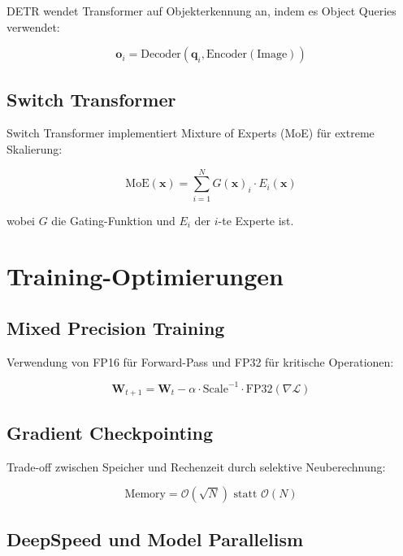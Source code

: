 DETR wendet Transformer auf Objekterkennung an, indem es Object Queries verwendet:

\begin{equation}
\mathbf{o}_i = \text{Decoder}(\mathbf{q}_i, \text{Encoder}(\text{Image}))
\end{equation}

\subsection{Switch Transformer}

Switch Transformer implementiert Mixture of Experts (MoE) für extreme Skalierung:

\begin{equation}
\text{MoE}(\mathbf{x}) = \sum_{i=1}^{N} G(\mathbf{x})_i \cdot E_i(\mathbf{x})
\end{equation}

wobei $G$ die Gating-Funktion und $E_i$ der $i$-te Experte ist.

\section{Training-Optimierungen}

\subsection{Mixed Precision Training}

Verwendung von FP16 für Forward-Pass und FP32 für kritische Operationen:

\begin{equation}
\mathbf{W}_{t+1} = \mathbf{W}_t - \alpha \cdot \text{Scale}^{-1} \cdot \text{FP32}(\nabla \mathcal{L})
\end{equation}

\subsection{Gradient Checkpointing}

Trade-off zwischen Speicher und Rechenzeit durch selektive Neuberechnung:

\begin{equation}
\text{Memory} = \mathcal{O}(\sqrt{N}) \text{ statt } \mathcal{O}(N)
\end{equation}

\subsection{DeepSpeed und Model Parallelism}

